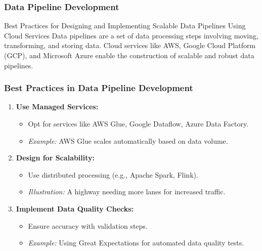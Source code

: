 \documentclass{beamer}
\begin{document}
\begin{frame}[fragile]
    \frametitle{Data Pipeline Development}
    \begin{block}{Best Practices for Designing and Implementing Scalable Data Pipelines Using Cloud Services}
        Data pipelines are a set of data processing steps involving moving, transforming, and storing data. Cloud services like AWS, Google Cloud Platform (GCP), and Microsoft Azure enable the construction of scalable and robust data pipelines.
    \end{block}
\end{frame}

\begin{frame}[fragile]
    \frametitle{Best Practices in Data Pipeline Development}
    \begin{enumerate}
        \item \textbf{Use Managed Services:}
            \begin{itemize}
                \item Opt for services like AWS Glue, Google Dataflow, Azure Data Factory.
                \item \textit{Example:} AWS Glue scales automatically based on data volume.
            \end{itemize}
            
        \item \textbf{Design for Scalability:}
            \begin{itemize}
                \item Use distributed processing (e.g., Apache Spark, Flink).
                \item \textit{Illustration:} A highway needing more lanes for increased traffic.
            \end{itemize}
        
        \item \textbf{Implement Data Quality Checks:}
            \begin{itemize}
                \item Ensure accuracy with validation steps.
                \item \textit{Example:} Using Great Expectations for automated data quality tests.
            \end{itemize}
    \end{enumerate}
\end{frame}
\end{document}
